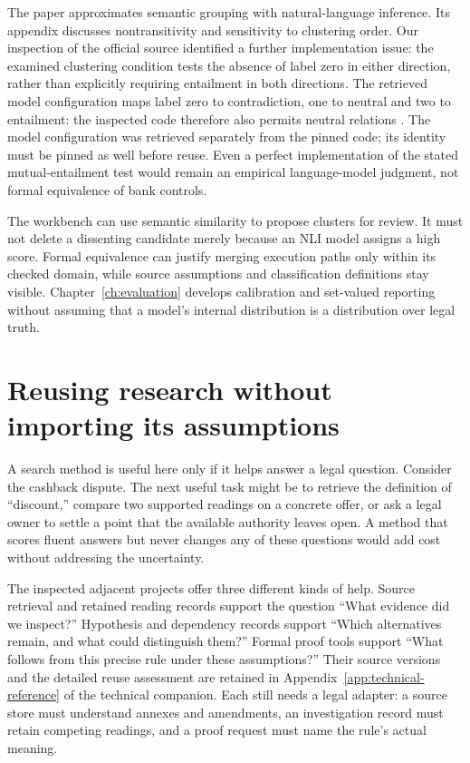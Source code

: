 \documentclass[12pt,a4paper,oneside,openany]{book}
\begin{document}
The paper approximates semantic grouping with natural-language inference. Its
appendix discusses nontransitivity and sensitivity to clustering order. Our
inspection of the official source identified a further implementation issue: the
examined clustering condition tests the absence of label zero in either direction,
rather than explicitly requiring entailment in both directions. The retrieved model configuration maps label zero to contradiction, one to
neutral and two to entailment: the inspected code therefore also permits neutral
relations \citep{semanticcode2023,debertaconfig}. The model configuration was retrieved separately from the pinned code;
its identity must be pinned as well before reuse. Even a
perfect implementation of the stated mutual-entailment test would remain an
empirical language-model judgment, not formal equivalence of bank controls.

The workbench can use semantic similarity to propose clusters for review. It
must not delete a dissenting candidate merely because an NLI model assigns a
high score. Formal equivalence can justify merging execution paths only within
its checked domain, while source assumptions and classification definitions stay
visible. Chapter~\ref{ch:evaluation} develops calibration and set-valued reporting
without assuming that a model's internal distribution is a distribution over
legal truth.

\section{Reusing research without importing its assumptions}
\label{sec:reader-reuse}

A search method is useful here only if it helps answer a legal question. Consider
the cashback dispute. The next useful task might be to retrieve the definition of
``discount,'' compare two supported readings on a concrete offer, or ask a legal
owner to settle a point that the available authority leaves open. A method that
scores fluent answers but never changes any of these questions would add cost
without addressing the uncertainty.

The inspected adjacent projects offer three different kinds of help. Source
retrieval and retained reading records support the question ``What evidence did
we inspect?'' Hypothesis and dependency records support ``Which alternatives
remain, and what could distinguish them?'' Formal proof tools support ``What
follows from this precise rule under these assumptions?'' Their source versions
and the detailed reuse assessment are retained in
Appendix~\ref{app:technical-reference} of the technical companion. Each still needs a legal adapter: a
source store must understand annexes and amendments, an investigation record must
retain competing readings, and a proof request must name the rule's actual
meaning.
\end{document}
